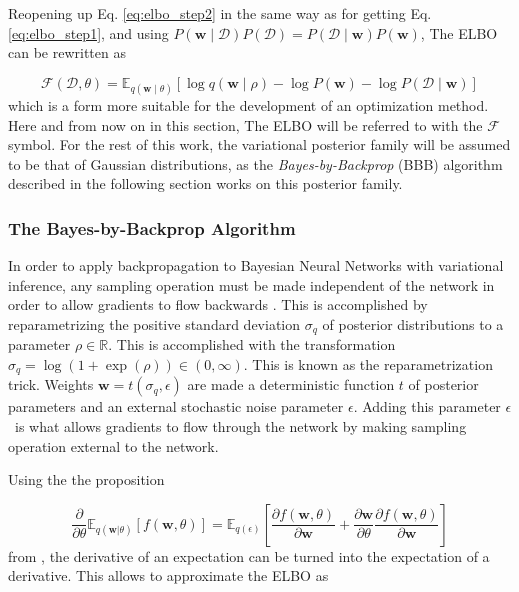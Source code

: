 	Reopening up Eq. \eqref{eq:elbo_step2} in the same way as for getting Eq. \eqref{eq:elbo_step1}, and using $P(\pmb{w} \mid \mathcal{D})P(\mathcal{D}) = P(\mathcal{D} \mid \pmb{w})P(\pmb{w})$, The ELBO can be rewritten as
	
	\begin{equation}
	\label{eq:elbo}
		\mathcal{F}(\mathcal{D}, \theta) = 
		\mathbb{E}_{q(\pmb{w} \mid \theta)}\left[
		\log q(\pmb{w}\mid \rho) - \log P(\pmb{w}) - \log P(\mathcal{D} \mid \pmb{w})
		\right]
	\end{equation}
	which is a form more suitable for the development of an optimization method. Here and from now on in this section, The ELBO will be referred to with the $\mathcal{F}$ symbol. For the rest of this work, the variational posterior family will be assumed to be that of Gaussian distributions, as the \textit{Bayes-by-Backprop} (BBB) algorithm described in the following section works on this posterior family. 
	
	\subsubsection*{The Bayes-by-Backprop Algorithm}

	In order to apply backpropagation to Bayesian Neural Networks with variational inference, any sampling operation must be made independent of the network in order to allow gradients to flow backwards \cite{blundell_weight_2015}. This is accomplished by reparametrizing the positive standard deviation $\sigma_q$ of posterior distributions to a parameter $\rho \in \mathbb{R}$. This is accomplished with the transformation $\sigma_q = \log(1 + \exp(\rho)) \in (0,\infty)$. 
	This is known as the reparametrization trick. Weights $\pmb{w} = t(\sigma_q, \epsilon)$ are made a deterministic function $t$ of posterior parameters and an external stochastic noise parameter $\epsilon$. Adding this parameter $\epsilon$ is what allows gradients to flow through the network by making sampling operation external to the network. 
	
	Using the the proposition
	
	\begin{equation}
	\label{eq:prop}
	\frac{\partial}{\partial \theta} \mathbb{E}_{q(\pmb{w}|\theta)}[f(\pmb{w}, \theta)] =
	\mathbb{E}_{q(\epsilon)}\left[\frac{\partial f(\pmb{w}, \theta)}{\partial \pmb{w}} + \frac{\partial \pmb{w}}{\partial \theta}
	\frac{\partial f(\pmb{w}, \theta)}{\partial \pmb{w}}\right]
	\end{equation}
	from \citet{blundell_weight_2015}, the derivative of an expectation can be turned into the expectation of a derivative. This allows to approximate the ELBO as 
	
